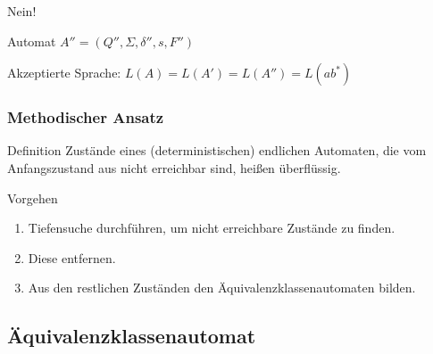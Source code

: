 \begin{frame}
Nein!
\begin{block}{Automat \(A'' = (Q'', \Sigma, \delta'', s, F'')\)}
 \begin{figure}[H]
\begin{center}
\end{center}
\end{figure}
\end{block}
\begin{block}{}
 Akzeptierte Sprache: \(L(A) = L(A') = L(A'') = L(ab^*) \)
\end{block}
\end{frame}
\begin{frame}
 \frametitle{Methodischer Ansatz}
 \begin{block}{Definition}
  Zustände eines (deterministischen) endlichen Automaten, die vom Anfangszustand aus nicht erreichbar sind, heißen überflüssig.
 \end{block}
\begin{block}{Vorgehen}
 \begin{enumerate}
  \item Tiefensuche durchführen, um nicht erreichbare Zustände zu finden.
  \item Diese entfernen.
  \item Aus den restlichen Zuständen den Äquivalenzklassenautomaten bilden.
 \end{enumerate}
\end{block}
\end{frame}

\subsection{Äquivalenzklassenautomat}

